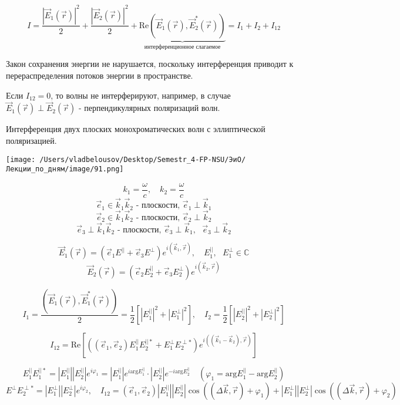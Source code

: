 \documentclass[12pt, a4paper]{report}
\begin{document}
\fi


\[ I = \frac{ |\vec{E } _1 (\vec{r } ) | ^2 }{2} +\frac{ |\vec{E } _2 (\vec{r } ) | ^2 }{2} +\underbrace{ \mathrm{Re } (\vec{E } _1 (\vec{r } ), \vec{E } _2^{*}  (\vec{r } ))}_{\text{интерференционное слагаемое} } = I_1 + I_2 + I_{12}   \] 

Закон сохранения энергии не нарушается, поскольку интерференция приводит к перераспределения потоков энергии в пространстве. 

Если \( I_{12} = 0  \), то волны не интерферируют, например, в случае \( \vec{E } _1 (\vec{r } )\perp \vec{E } _2 (\vec{r } ) \) - перпендикулярных поляризаций волн. 

Интерференция двух плоских монохроматических волн с эллиптической поляризацией. 

\begin{center}
    \texttt{[image: /Users/vladbelousov/Desktop/Semestr\_4-FP-NSU/ЭиО/Лекции\_по\_дням/image/91.png]}
\end{center} 
\[k_1 = \frac{\omega }{c } ,\quad  k_2 = \frac{\omega}{c }   \]
\[ \vec{e } _1 \in  \vec{k}_1 \vec{k } _2 \text{ - плоскости,     } \vec{e}_1 \perp \vec{k } _1    \]  
\[ \vec{e } _2 \in  \vec{k}_1 \vec{k } _2 \text{ - плоскости,     } \vec{e}_2 \perp \vec{k } _2   \]  
\[ \vec{e } _3 \perp   \vec{k}_1 \vec{k } _2 \text{ - плоскости,     } \vec{e}_3 \perp \vec{k } _1 , \text{ } \vec{e}_3 \perp \vec{k } _2   \]  

\[ \vec{E } _ 1 (\vec{r } ) = ( \vec{e } _1 E ^{ ||} + \vec{e } _3 E^{ \perp  }  )e^{ i (\vec{k }_1 , \vec{r } )} , \quad  E_1 ^{||}  , \text{ } E_1 ^{\perp } \in \mathbb{C}    \] 
\[ \vec{E } _2 (\vec{r }  ) = ( \vec{e } _2 E_2 ^{ || }  + \vec{e } _3 E_2^{ \perp }     )e^{ i (\vec{k } _2 ,\vec{r} )}   \] 

\[ I_1 = \frac{(\vec{E }_1 (\vec{r } ) , \vec{E } _1 ^{* } (\vec{r } ) )}{2 } = \frac{1}{2 } [|E _1 ^{||}  | ^2 + |E_1^{\perp } | ^2 ] , \quad  I_2 = \frac{1}{2 }  [|E_2^{||} | ^2 + |E_2 ^{ \perp } | ^2 ]  \] 

\[ I_{12} = \mathrm{Re }  [ ((\vec{e } _1 ,\vec{e } _2 ) E_1^{||}E_2 ^{||*} + E_1^{ \perp } E_2 ^{\perp *}    )e^{i ((\vec{k }_1 - \vec{k } _2  ), \vec{r} )} ]  \] 

\[ E_1 ^{ || }  E_1 ^{ || * } = |E_1 ^{||} ||E_2 ^{||} | e^{ i \varphi_1} = |E_1 ^{||} | e^{ i \mathrm{arg } E_1 ^{||}  } \cdot |E_2 ^{||} |e^{- i \mathrm{arg } E_2^{||}  }  \quad  (\varphi_1 = \mathrm{arg } E_1 ^{ ||}  - \mathrm{arg } E_2 ^{ ||}   )     \] 
\[ E^{ \perp  }E_2^{ \perp * } = |E_1   ^{ \perp } ||E_2 ^{\perp } |e^{ i \varphi_2 } , \quad  I_{12} = (\vec{e } _1 ,\vec{e } _2 ) |E_1 ^{ || } ||E_2 ^{ ||} | \cos ((\Delta \vec{k } , \vec{r } )+ \varphi_1 )+ |E_1 ^{ \perp }  ||E_2 ^{\perp } | \cos    ((\Delta \vec{k } ,\vec{r } )+ \varphi_2  ) \] 
\end{document}
